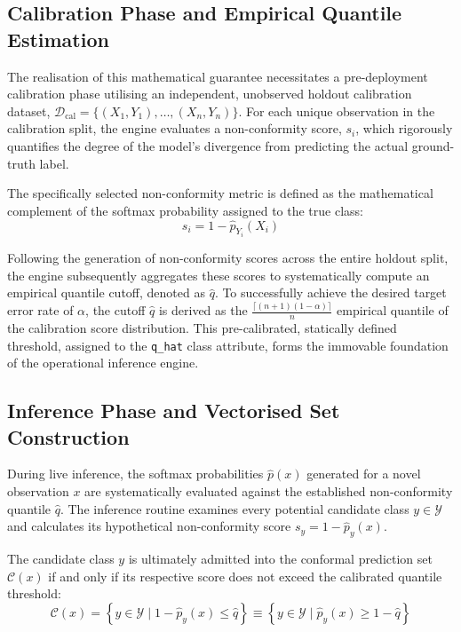 \subsection{Calibration Phase and Empirical Quantile Estimation}

The realisation of this mathematical guarantee necessitates a pre-deployment calibration phase utilising an independent, unobserved holdout calibration dataset, $\mathcal{D}_{\text{cal}} = \{(X_1, Y_1), \dots, (X_n, Y_n)\}$. For each unique observation in the calibration split, the engine evaluates a non-conformity score, $s_i$, which rigorously quantifies the degree of the model's divergence from predicting the actual ground-truth label.

The specifically selected non-conformity metric is defined as the mathematical complement of the softmax probability assigned to the true class:
\begin{equation}
    s_i = 1 - \hat{p}_{Y_i}(X_i)
\end{equation}

Following the generation of non-conformity scores across the entire holdout split, the engine subsequently aggregates these scores to systematically compute an empirical quantile cutoff, denoted as $\hat{q}$. To successfully achieve the desired target error rate of $\alpha$, the cutoff $\hat{q}$ is derived as the $\frac{\lceil (n+1)(1-\alpha) \rceil}{n}$ empirical quantile of the calibration score distribution. This pre-calibrated, statically defined threshold, assigned to the \texttt{q\_hat} class attribute, forms the immovable foundation of the operational inference engine.

\subsection{Inference Phase and Vectorised Set Construction}

During live inference, the softmax probabilities $\hat{p}(x)$ generated for a novel observation $x$ are systematically evaluated against the established non-conformity quantile $\hat{q}$. The inference routine examines every potential candidate class $y \in \mathcal{Y}$ and calculates its hypothetical non-conformity score $s_y = 1 - \hat{p}_y(x)$.

The candidate class $y$ is ultimately admitted into the conformal prediction set $\mathcal{C}(x)$ if and only if its respective score does not exceed the calibrated quantile threshold:
\begin{equation}
    \mathcal{C}(x) = \left\{ y \in \mathcal{Y} \mid 1 - \hat{p}_y(x) \le \hat{q} \right\} \equiv \left\{ y \in \mathcal{Y} \mid \hat{p}_y(x) \ge 1 - \hat{q} \right\}
\end{equation}

